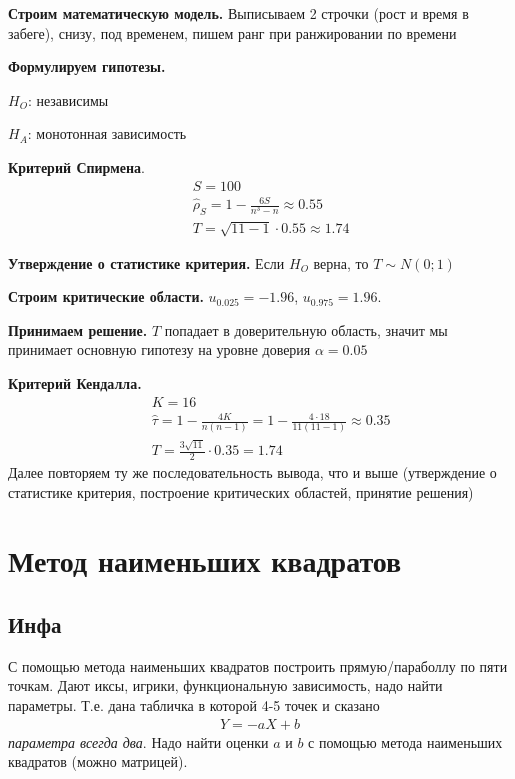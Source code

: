 \documentclass[12pt]{extarticle}
\begin{document}
\par\textbf{Строим математическую модель.} Выписываем 2 строчки (рост и
время в забеге), снизу, под временем, пишем ранг при ранжировании по
времени
\par\textbf{Формулируем гипотезы.}
\begin{description}
    \item $H_{O}$: независимы
    \item $H_{A}$: монотонная зависимость
\end{description}
\par \textbf{Критерий Спирмена}.
\begin{eqnarray*}
    &&S=100\\
    &&\hat{\rho}_{S}=1-\frac{6S}{n^{3}-n}\approx 0.55\\
    &&T=\sqrt{11-1}\cdot 0.55\approx 1.74
\end{eqnarray*}
\par\textbf{Утверждение о статистике критерия.} Если $H_{O}$ верна, то
$T\sim N(0;1)$
\par\textbf{Строим критические области.} $u_{0.025}=-1.96$,
$u_{0.975}=1.96$.
\par\textbf{Принимаем решение.} $T$ попадает в доверительную область,
значит мы принимает основную гипотезу на уровне доверия $\alpha=0.05$

\par\textbf{Критерий Кендалла.}
\begin{eqnarray*}
&&K=16\\
&&\hat{\tau}=1-\frac{4K}{n(n-1)} = 1-\frac{4\cdot
18}{11(11-1)}\approx 0.35\\
&&T = \frac{3\sqrt{11}}{2}\cdot 0.35 = 1.74
\end{eqnarray*}
Далее повторяем ту же последовательность вывода, что и выше (утверждение
о статистике критерия, построение критических областей, принятие решения)



\section{Метод наименьших квадратов}
\subsection{Инфа}
С помощью метода наименьших квадратов построить прямую/параболлу по пяти
точкам. Дают иксы, игрики, функциональную зависимость, надо найти
параметры. Т.е. дана табличка в которой 4-5 точек и сказано
\begin{eqnarray*}
Y=-aX + b
\end{eqnarray*}
\textit{параметра всегда два}. Надо найти оценки $a$ и $b$ с помощью
метода наименьших квадратов (можно матрицей).
\end{document}
